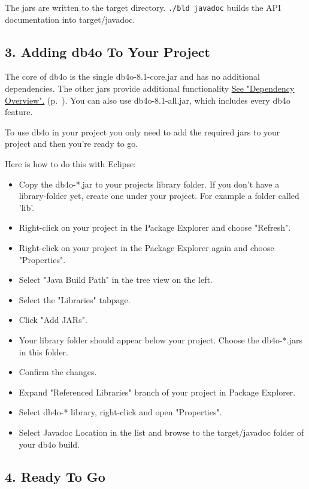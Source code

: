 The jars are written to the target directory. \texttt{./bld javadoc} builds the API documentation into target/javadoc.

\subsection*{3. Adding db4o To Your Project}

The core of db4o is the single db4o-8.1-core.jar and has no additional dependencies. The other jars provide additional functionality \hyperref[ref:dependency-overview]{See "Dependency Overview".} (p.~\pageref{ref:dependency-overview}). You can also use db4o-8.1-all.jar, which includes every db4o feature.

To use db4o in your project you only need to add the required jars to your project and then you're ready to go.

Here is how to do this with Eclipse:

\begin{itemize}
\item Copy the db4o-*.jar to your projects library folder. If you don't have a library-folder yet, create one under your project. For example a folder called 'lib'.
\item Right-click on your project in the Package Explorer and choose "Refresh".
\item Right-click on your project in the Package Explorer again and choose "Properties".
\item Select "Java Build Path" in the tree view on the left.
\item Select the "Libraries" tabpage.
\item Click "Add JARs".
\item Your library folder should appear below your project. Choose the db4o-*.jars in this folder.
\item Confirm the changes.
\item Expand "Referenced Libraries" branch of your project in Package Explorer.
\item Select db4o-* library, right-click and open "Properties".
\item Select Javadoc Location in the list and browse to the target/javadoc folder of your db4o build.
\end{itemize}

\subsection*{4. Ready To Go}

